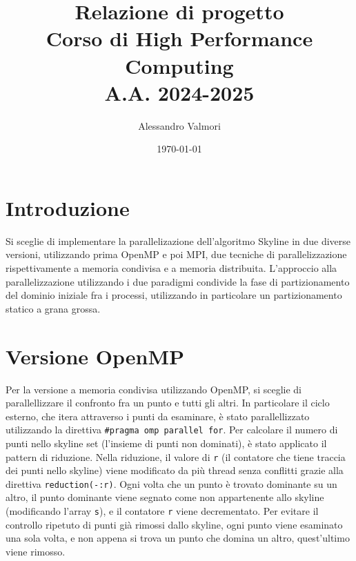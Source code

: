 \documentclass[letterpaper,11pt,leqno]{article}
\title{\vspace{-1cm} Relazione di progetto \\ Corso di High Performance Computing \\ A.A. 2024-2025}
\author{Alessandro Valmori}
\date{\vspace{-0.5cm} \today}  %
\begin{document}
\begingroup\let\newpage\relax\maketitle\endgroup  %

\vspace{-1cm}  %





\section{Introduzione}\label{s:introduction}
 
Si sceglie di implementare la parallelizazione dell'algoritmo Skyline in due diverse versioni, utilizzando prima OpenMP e poi MPI, due tecniche di parallelizzazione rispettivamente a memoria condivisa e a memoria distribuita. L'approccio alla parallelizzazione utilizzando i due paradigmi condivide la fase di partizionamento del dominio iniziale fra i processi, utilizzando in particolare un partizionamento statico a grana grossa. 



\section{Versione OpenMP}\label{s:section}


Per la versione a memoria condivisa utilizzando OpenMP, si sceglie di parallellizzare il confronto fra un punto e tutti gli altri. In particolare il ciclo esterno, che itera attraverso i punti da esaminare, è stato parallellizzato utilizzando la direttiva \texttt{\#pragma omp parallel for}. Per calcolare il numero di punti nello skyline set (l'insieme di punti non dominati), è stato applicato il pattern di riduzione. Nella riduzione, il valore di \texttt{r} (il contatore che tiene traccia dei punti nello skyline) viene modificato da più thread senza conflitti grazie alla direttiva \texttt{reduction(-:r)}. Ogni volta che un punto è trovato dominante su un altro, il punto dominante viene segnato come non appartenente allo skyline (modificando l'array \texttt{s}), e il contatore \texttt{r} viene decrementato. Per evitare il controllo ripetuto di punti già rimossi dallo skyline, ogni punto viene esaminato una sola volta, e non appena si trova un punto che domina un altro, quest'ultimo viene rimosso.
\end{document}
